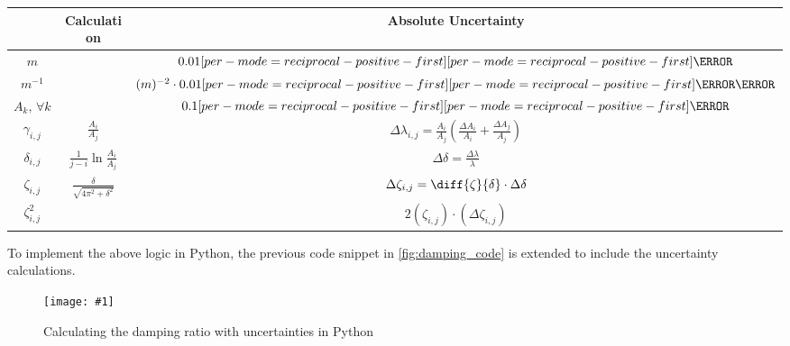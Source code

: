 \documentclass[a4paper,12pt]{article}
\let\oldsi\si
\renewcommand{\si}[1]{\oldsi[per-mode=reciprocal-positive-first]{#1}}
\newcommand{\img}[4]{\begin{center}
  \begin{figure}[H]
    \centering
    \texttt{[image: \#1]}
    \caption{#3}
    \label{fig:#4}
  \end{figure}
\end{center}}
\newcommand{\thcolor}{\cellcolor{Blue!25}}
\newcommand{\chcolor}{\cellcolor{RedOrange!25}}
\begin{document}
\begin{table}[htbp]
  \begin{center}
    \bgroup
    \renewcommand{\arraystretch}{2}
    \begin{tabular}{|c|c|c|}
      \hline
      \thcolor {Variable}       & \thcolor Calculation                      & \thcolor Absolute Uncertainty                                                                      \\ \hline
      $m$                       &                                           & $0.01\si{\g}$                                                                                      \\ \hline
      \chcolor $m^{-1}$         &                                           & $(m)^{-2}\cdot 0.01\si{\per\g}$                                                                    \\ \hline
      $A_k,\,\forall k$         &                                           & $0.1\si{\cm}$                                                                                      \\ \hline
      $\gamma_{i,j}$            & $\frac{A_i}{A_{j}}$                       & $\Delta \lambda_{i, j} = \frac{A_i}{A_{j}}(\frac{\Delta A_i}{A_{i}} + \frac{\Delta A_{j}}{A_{j}})$ \\ \hline
      $\delta_{i,j}$            & $\frac{1}{j - i}\ln{\frac{A_i}{A_{j}}}$   & $\Delta \delta = \frac{\Delta \lambda}{\lambda}$                                                   \\ \hline
      $\zeta_{i, j}$            & $\frac{\delta}{\sqrt{4\pi^2 + \delta^2}}$ & $\Delta \zeta_{i, j} = \diff{\zeta}{\delta} \cdot \Delta\delta$                                    \\ \hline
      \chcolor $\zeta_{i, j}^2$ &                                           & $2(\zeta_{i, j})\cdot (\Delta \zeta_{i, j})$                                                       \\ \hline
    \end{tabular}
    \label{tab:6}
    \egroup
  \end{center}
\end{table}

\vspace{\baselineskip}
To implement the above logic in Python, the previous code snippet in \cref{fig:damping_code} is extended to include the uncertainty calculations.

\img{figs/code/unc.png}{0.9}{Calculating the damping ratio with uncertainties in Python}{unc_code}
\end{document}
